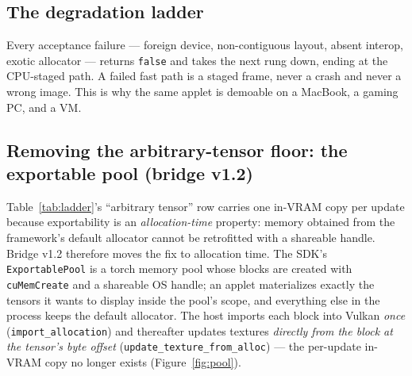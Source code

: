 \documentclass[11pt]{article}
\begin{document}
\subsection{The degradation ladder}

Every acceptance failure --- foreign device, non-contiguous layout, absent
interop, exotic allocator --- returns \texttt{false} and takes the next rung
down, ending at the CPU-staged path. A failed fast path is a staged frame,
never a crash and never a wrong image. This is why the same applet is
demoable on a MacBook, a gaming PC, and a VM.

\subsection{Removing the arbitrary-tensor floor: the exportable pool
(bridge v1.2)}
\label{sec:pool}

Table~\ref{tab:ladder}'s ``arbitrary tensor'' row carries one in-VRAM copy
per update because exportability is an \emph{allocation-time} property:
memory obtained from the framework's default allocator cannot be retrofitted
with a shareable handle. Bridge v1.2 therefore moves the fix to allocation
time. The SDK's \texttt{ExportablePool} is a torch memory pool whose blocks
are created with \texttt{cuMemCreate} and a shareable OS handle; an applet
materializes exactly the tensors it wants to display inside the pool's scope,
and everything else in the process keeps the default allocator. The host
imports each block into Vulkan \emph{once} (\texttt{import\_allocation}) and
thereafter updates textures \emph{directly from the block at the tensor's
byte offset} (\texttt{update\_texture\_from\_alloc}) --- the per-update
in-VRAM copy no longer exists (Figure~\ref{fig:pool}).
\end{document}
